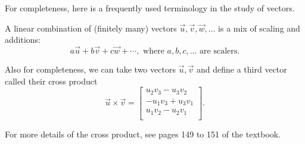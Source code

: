 \documentclass[../main.tex]{subfiles}
\begin{document}
For completeness, here is a frequently used terminology in the study of vectors.

A linear combination of (finitely many) vectors \(\vec{u}, \vec{v}, \vec{w}, \ldots\) is a mix of scaling and additions:
\[
  a \vec{u} + b \vec{v} + c \vec{w} + \cdots, \text{ where \(a,b,c, \ldots\) are scalers}.
\]

Also for completeness, we can take two vectors \(\vec{u}, \vec{v}\) and define a third vector called their cross product 
\[
  \vec{u} \times \vec{v} = 
  \begin{bmatrix}
    u_{2} v_{3} - u_{3} v_{2} \\
    - u_{1} v_{3} + u_{3} v_{1} \\
    u_{1} v_{2} - u_{2} v_{1} \\
  \end{bmatrix}.
\]

For more details of the cross product, see pages 149 to 151 of the textbook. 
\end{document}
